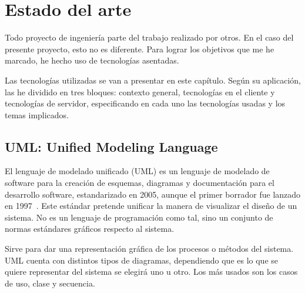 \documentclass[a4paper, 12pt]{book}
\begin{document}

\cleardoublepage
\chapter{Estado del arte}

Todo proyecto de ingeniería parte del trabajo realizado por otros. En el caso del presente proyecto, esto no es diferente. Para lograr los objetivos que me he marcado, he hecho uso de tecnologías asentadas.

Las tecnologías utilizadas se van a presentar en este capítulo. Según su aplicación, las he dividido en tres bloques: contexto general,
tecnologías en el cliente y tecnologías de servidor, especificando en cada uno las tecnologías usadas y los temas
implicados.

\section{UML: Unified Modeling Language}
\label{sec:seccion1}

El lenguaje de modelado unificado (UML) es un lenguaje de modelado de software para la creación de esquemas, diagramas y documentación
para el desarrollo software, estandarizado en 2005, aunque el primer borrador fue lanzado
en 1997~\cite{booch1996unified,rumbaugh2004unified}. Este estándar pretende unificar la manera de visualizar el diseño de un sistema.
No es un lenguaje de programación como tal, sino un conjunto de normas estándares gráficos
respecto al sistema.

Sirve para dar una representación gráfica de los procesos o métodos del sistema. UML cuenta con distintos
tipos de diagramas, dependiendo que es lo que se quiere representar del sistema se elegirá uno u otro. Los más usados son
los casos de uso, clase y secuencia.
\end{document}
